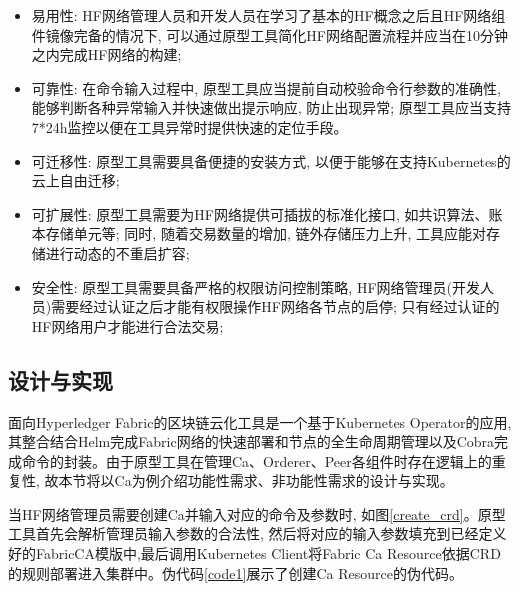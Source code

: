 \begin{itemize}[itemindent=2em]
    \item 易用性: HF网络管理人员和开发人员在学习了基本的HF概念之后且HF网络组件镜像完备的情况下, 可以通过原型工具简化HF网络配置流程并应当在10分钟之内完成HF网络的构建;

    \item 可靠性: 在命令输入过程中, 原型工具应当提前自动校验命令行参数的准确性, 能够判断各种异常输入并快速做出提示响应, 防止出现异常; 原型工具应当支持7*24h监控以便在工具异常时提供快速的定位手段。

    \item 可迁移性: 原型工具需要具备便捷的安装方式, 以便于能够在支持Kubernetes的云上自由迁移;

    \item 可扩展性: 原型工具需要为HF网络提供可插拔的标准化接口, 如共识算法、账本存储单元等; 同时, 随着交易数量的增加, 链外存储压力上升, 工具应能对存储进行动态的不重启扩容;

    \item 安全性: 原型工具需要具备严格的权限访问控制策略, HF网络管理员(开发人员)需要经过认证之后才能有权限操作HF网络各节点的启停; 只有经过认证的HF网络用户才能进行合法交易;
\end{itemize}


\subsection{设计与实现}

面向Hyperledger Fabric的区块链云化工具是一个基于Kubernetes Operator的应用, 其整合结合Helm完成Fabric网络的快速部署和节点的全生命周期管理以及Cobra\footnotemark[1]完成命令的封装。由于原型工具在管理Ca、Orderer、Peer各组件时存在逻辑上的重复性, 故本节将以Ca为例介绍功能性需求、非功能性需求的设计与实现。

当HF网络管理员需要创建Ca并输入对应的命令及参数时, 如图\ref{create_crd}。原型工具首先会解析管理员输入参数的合法性, 然后将对应的输入参数填充到已经定义好的FabricCA模版中,最后调用Kubernetes Client将Fabric Ca Resource依据CRD的规则部署进入集群中。伪代码\ref{code1}展示了创建Ca Resource的伪代码。

